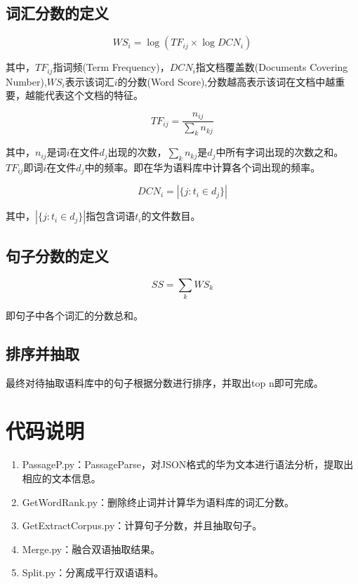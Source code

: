 \documentclass{ctexart}
\begin{document}
\subsection{词汇分数的定义}

    \begin{equation}
        WS_i = \log (TF_{ij} \times  \log DCN_i)
    \end{equation}

其中，$TF_{ij}$指词频(Term Frequency)，$DCN_{i}$指文档覆盖数(Documents Covering Number),$WS_i$表示该词汇$i$的分数(Word Score),分数越高表示该词在文档中越重要，越能代表这个文档的特征。

\begin{equation}
    TF_{ij}=\frac{n_{ij}}{\sum_k{n_{kj}}}
\end{equation}

其中，$n_{ij}$是词$i$在文件$d_j$出现的次数，$\sum_k{n_{kj}}$是$d_j$中所有字词出现的次数之和。$TF_{ij}$即词$i$在文件$d_j$中的频率。即在华为语料库中计算各个词出现的频率。

\begin{equation}
    DCN_{i}=|\{j:t_i\in d_j \}|
\end{equation}

其中，$|\{j:t_i\in d_j \}|$指包含词语$t_i$的文件数目。

\subsection{句子分数的定义}

\begin{equation}
    SS=\sum_k WS_k
\end{equation}

    即句子中各个词汇的分数总和。

\subsection{排序并抽取}
最终对待抽取语料库中的句子根据分数进行排序，并取出top n即可完成。
\section{代码说明}

\begin{enumerate}
    \item PassageP.py：PassageParse，对JSON格式的华为文本进行语法分析，提取出相应的文本信息。 
    \item GetWordRank.py：删除终止词并计算华为语料库的词汇分数。
    \item GetExtractCorpus.py：计算句子分数，并且抽取句子。
    \item Merge.py：融合双语抽取结果。
    \item Split.py：分离成平行双语语料。
\end{enumerate}
\end{document}
